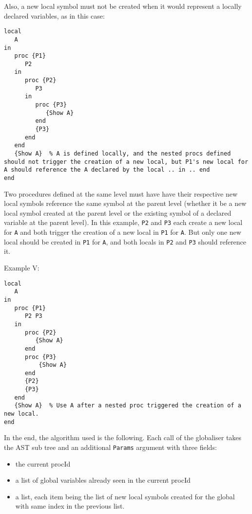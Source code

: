 \documentclass[a4paper]{memoir}
\begin{document}
Also, a new local symbol must not be created when it would represent a locally declared variables, as in this case:

\begin{lstlisting}
local
   A
in
   proc {P1}
      P2
   in
      proc {P2}
         P3
      in
         proc {P3}
            {Show A}
         end
         {P3}
      end
   end
   {Show A}  % A is defined locally, and the nested procs defined should not trigger the creation of a new local, but P1's new local for A should reference the A declared by the local .. in .. end
end
\end{lstlisting}

Two procedures defined at the same level must have have their respective new local symbols reference the same symbol at the parent level (whether it be a new local symbol created at the parent level or the existing symbol of a declared variable at the parent level). In this example, \lstinline!P2! and \lstinline!P3! each create a new local for \lstinline!A! and both trigger the creation of a new local in \lstinline!P1! for \lstinline!A!. But only one new local should be created in \lstinline!P1! for \lstinline!A!, and both locals in \lstinline!P2! and \lstinline!P3! should reference it.


Example V:
\begin{lstlisting}
local
   A
in
   proc {P1}
      P2 P3
   in
      proc {P2}
         {Show A}
      end
      proc {P3}
          {Show A}
      end
      {P2}
      {P3}
   end
   {Show A}  % Use A after a nested proc triggered the creation of a new local.
end
\end{lstlisting}

In the end, the algorithm used is the following.
Each call of the globaliser takes the AST sub tree and an additional \lstinline!Params! argument with three fields:
\begin{itemize}
   \item the current procId
   \item a list of global variables already seen in the current procId
   \item a list, each item being the list of new local symbols created for the global with same index in the previous list.
\end{itemize}
\end{document}
